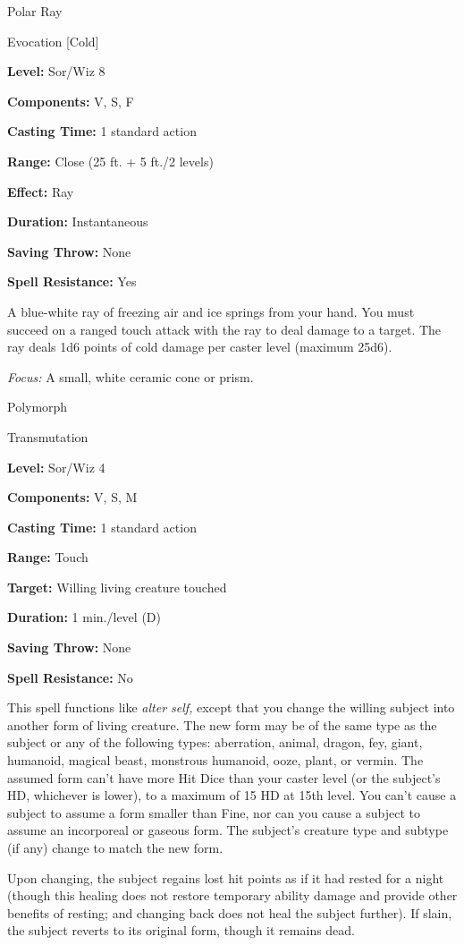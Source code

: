 \documentclass{article}
\begin{document}
\vspace{12pt}
Polar Ray

Evocation [Cold]

\textbf{Level:} Sor/Wiz 8

\textbf{Components:} V, S, F

\textbf{Casting Time:} 1 standard action

\textbf{Range:} Close (25 ft. + 5 ft./2 levels)

\textbf{Effect:} Ray

\textbf{Duration:} Instantaneous

\textbf{Saving Throw:} None

\textbf{Spell Resistance:} Yes

A blue-white ray of freezing air and ice springs from your hand. You must succeed 
on a ranged touch attack with the ray to deal damage to a target. The ray deals 
1d6 points of cold damage per caster level (maximum 25d6).

\textit{Focus: }A small, white ceramic cone or prism.

\vspace{12pt}
Polymorph

Transmutation

\textbf{Level:} Sor/Wiz 4

\textbf{Components:} V, S, M

\textbf{Casting Time:} 1 standard action

\textbf{Range:} Touch

\textbf{Target: }Willing living creature touched

\textbf{Duration:} 1 min./level (D)

\textbf{Saving Throw:} None

\textbf{Spell Resistance:} No

This spell functions like \textit{alter self, }except that you change the willing 
subject into another form of living creature. The new form may be of the same type 
as the subject or any of the following types: aberration, animal, dragon, fey, 
giant, humanoid, magical beast, monstrous humanoid, ooze, plant, or vermin. The 
assumed form can't have more Hit Dice than your caster level (or the subject's 
HD, whichever is lower), to a maximum of 15 HD at 15th level. You can't cause a 
subject to assume a form smaller than Fine, nor can you cause a subject to assume 
an incorporeal or gaseous form. The subject's creature type and subtype (if any) 
change to match the new form.

Upon changing, the subject regains lost hit points as if it had rested for a night 
(though this healing does not restore temporary ability damage and provide other 
benefits of resting; and changing back does not heal the subject further). If slain, 
the subject reverts to its original form, though it remains dead.
\end{document}

